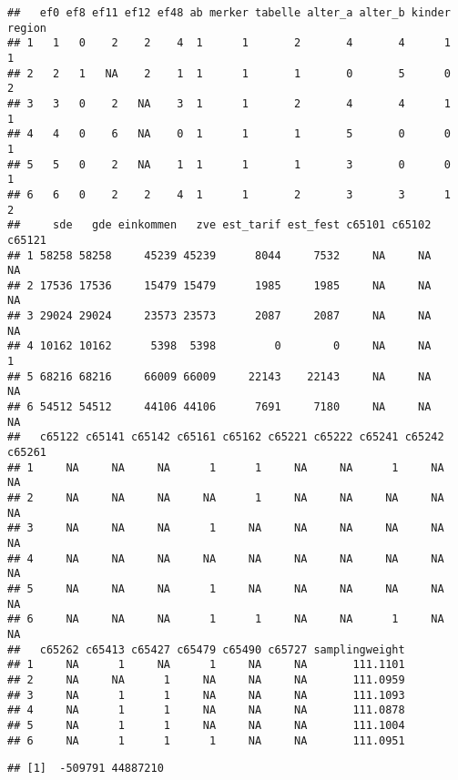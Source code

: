 \documentclass[]{article}
\newenvironment{Shaded}{\begin{snugshade}}{\end{snugshade}}
\newcommand{\KeywordTok}[1]{\textcolor[rgb]{0.13,0.29,0.53}{\textbf{#1}}}
\newcommand{\DataTypeTok}[1]{\textcolor[rgb]{0.13,0.29,0.53}{#1}}
\newcommand{\StringTok}[1]{\textcolor[rgb]{0.31,0.60,0.02}{#1}}
\newcommand{\OtherTok}[1]{\textcolor[rgb]{0.56,0.35,0.01}{#1}}
\newcommand{\OperatorTok}[1]{\textcolor[rgb]{0.81,0.36,0.00}{\textbf{#1}}}
\newcommand{\NormalTok}[1]{#1}
\begin{document}
\begin{verbatim}
##   ef0 ef8 ef11 ef12 ef48 ab merker tabelle alter_a alter_b kinder region
## 1   1   0    2    2    4  1      1       2       4       4      1      1
## 2   2   1   NA    2    1  1      1       1       0       5      0      2
## 3   3   0    2   NA    3  1      1       2       4       4      1      1
## 4   4   0    6   NA    0  1      1       1       5       0      0      1
## 5   5   0    2   NA    1  1      1       1       3       0      0      1
## 6   6   0    2    2    4  1      1       2       3       3      1      2
##     sde   gde einkommen   zve est_tarif est_fest c65101 c65102 c65121
## 1 58258 58258     45239 45239      8044     7532     NA     NA     NA
## 2 17536 17536     15479 15479      1985     1985     NA     NA     NA
## 3 29024 29024     23573 23573      2087     2087     NA     NA     NA
## 4 10162 10162      5398  5398         0        0     NA     NA      1
## 5 68216 68216     66009 66009     22143    22143     NA     NA     NA
## 6 54512 54512     44106 44106      7691     7180     NA     NA     NA
##   c65122 c65141 c65142 c65161 c65162 c65221 c65222 c65241 c65242 c65261
## 1     NA     NA     NA      1      1     NA     NA      1     NA     NA
## 2     NA     NA     NA     NA      1     NA     NA     NA     NA     NA
## 3     NA     NA     NA      1     NA     NA     NA     NA     NA     NA
## 4     NA     NA     NA     NA     NA     NA     NA     NA     NA     NA
## 5     NA     NA     NA      1     NA     NA     NA     NA     NA     NA
## 6     NA     NA     NA      1      1     NA     NA      1     NA     NA
##   c65262 c65413 c65427 c65479 c65490 c65727 samplingweight
## 1     NA      1     NA      1     NA     NA       111.1101
## 2     NA     NA      1     NA     NA     NA       111.0959
## 3     NA      1      1     NA     NA     NA       111.1093
## 4     NA      1      1     NA     NA     NA       111.0878
## 5     NA      1      1     NA     NA     NA       111.1004
## 6     NA      1      1      1     NA     NA       111.0951
\end{verbatim}

\begin{Shaded}
\end{Shaded}

\begin{verbatim}
## [1]  -509791 44887210
\end{verbatim}
\end{document}
